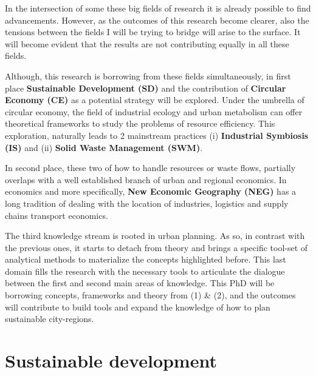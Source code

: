 In the intersection of some these big fields of research it is already possible to find advancements. However, as the outcomes of this research become clearer, also the tensions between the fields I will be trying to bridge will arise to the surface. It will become evident that the results are not contributing equally in all these fields. \par

Although, this research is borrowing from these fields simultaneously, in first place \textbf{Sustainable Development (SD)} and the contribution of \textbf{Circular Economy (CE)} as a potential strategy will be explored. Under the umbrella of circular economy, the field of industrial ecology and urban metabolism can offer theoretical frameworks to study the problems of resource efficiency. This exploration, naturally leads to 2 mainstream practices (i) \textbf{Industrial Symbiosis (IS)} and (ii) \textbf{Solid Waste Management (SWM)}. \par  

In second place, these two of how to handle resources or waste flows, partially overlaps with a well established branch of urban and regional economics. In economics and more specifically, \textbf{New Economic Geography (NEG)} has a long tradition of dealing with the location of industries, logistics and supply chains transport economics.\par

The third knowledge stream is rooted in urban planning. As so, in contrast with the previous ones, it starts to detach from theory and brings a specific tool-set of analytical methods to materialize the concepts highlighted before. This last domain fills the research with the necessary tools to articulate the dialogue between the first and second main areas of knowledge. This PhD will be borrowing concepts, frameworks and theory from (1) \& (2), and the outcomes will contribute to build tools and expand the knowledge of how to plan sustainable city-regions. \par

\section{Sustainable development}

